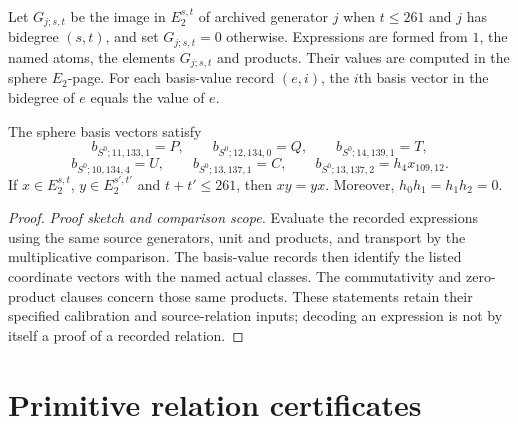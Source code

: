 \begin{theorem}
\label{sem:Computation:named-basis-identities}
Let $G_{j;s,t}$ be the image in $E_2^{s,t}$ of archived generator $j$ when $t\leq261$ and $j$ has bidegree $(s,t)$, and set $G_{j;s,t}=0$ otherwise. Expressions are formed from $1$, the named atoms, the elements $G_{j;s,t}$ and products. Their values are computed in the sphere $E_2$-page. For each basis-value record $(e,i)$, the $i$th basis vector in the bidegree of $e$ equals the value of $e$.

The sphere basis vectors satisfy
\[b_{S^0;11,133,1}=P,\qquad b_{S^0;12,134,0}=Q,\qquad b_{S^0;14,139,1}=T,\]
\[b_{S^0;10,134,4}=U,\qquad b_{S^0;13,137,1}=C,\qquad b_{S^0;13,137,2}=h_4x_{109,12}.\]
If $x\in E_2^{s,t}$, $y\in E_2^{s\prime,t\prime}$ and $t+t\prime\leq261$, then $xy=yx$. Moreover, $h_0h_1=h_1h_2=0$.
\end{theorem}
\begin{proof}
\textit{Proof sketch and comparison scope.}
Evaluate the recorded expressions using the same source generators,
unit and products, and transport by the multiplicative comparison.
The basis-value records then identify the listed coordinate vectors
with the named actual classes. The commutativity and zero-product
clauses concern those same products. These statements retain their
specified calibration and source-relation inputs; decoding an expression
is not by itself a proof of a recorded relation.
\end{proof}


\section{Primitive relation certificates}


